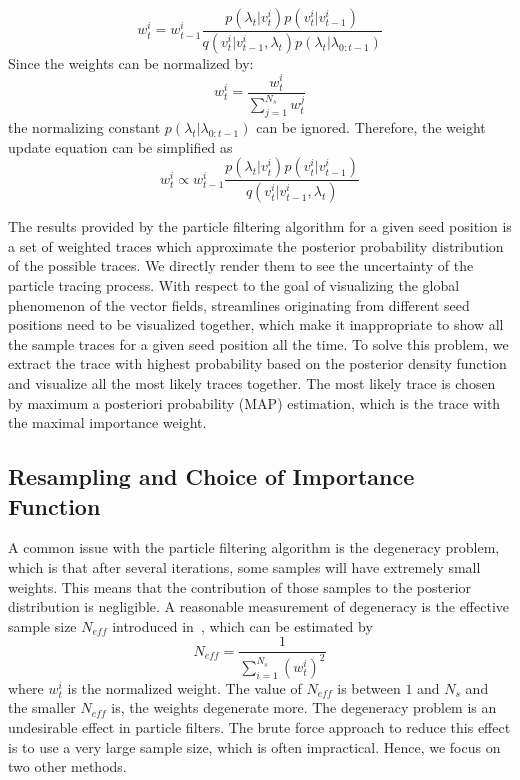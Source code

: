 \begin{equation}
  w_t^i = w_{t - 1}^i\frac{{p({\lambda_t}|v_t^i)p(v_t^i|v_{t - 1}^i)}}{{q(v_t^i|v_{t - 1}^i,{\lambda_t})p({\lambda_t}|{\lambda_{0:t - 1}})}}
\end{equation}
Since the weights can be normalized by:
\begin{equation}
  w_t^i = \frac{{w_t^i}}{{\sum\limits_{j = 1}^{{N_s}} {w_t^j} }}
\end{equation}
the normalizing constant ${p({\lambda_t}|{\lambda_{0:t - 1}})}$ can be ignored. Therefore, the weight update equation can be simplified as
\begin{equation}
  w_t^i \propto w_{t - 1}^i\frac{{p({\lambda_t}|v_t^i)p(v_t^i|v_{t - 1}^i)}}{{q(v_t^i|v_{t - 1}^i,{\lambda_t})}}
\end{equation}

The results provided by the particle filtering algorithm for a given seed position is a set of weighted traces which approximate the posterior probability distribution of the possible traces. We directly render them to see the uncertainty of the particle tracing process. With respect to the goal of visualizing the global phenomenon of the vector fields, streamlines originating from different seed positions need to be visualized together, which make it inappropriate to show all the sample traces for a given seed position all the time. To solve this problem, we extract the trace with highest probability based on the posterior density function and visualize all the most likely traces together. The most likely trace is chosen by maximum a posteriori probability (MAP) estimation, which is the trace with the maximal importance weight.

\subsection{Resampling and Choice of Importance Function}

A common issue with the particle filtering algorithm is the degeneracy problem, which is that after several iterations, some samples will have extremely small weights. This means that the contribution of those samples to the posterior distribution is negligible. A reasonable measurement of degeneracy is the effective sample size $N_{eff}$ introduced in~\cite{Liu98sequentialmonte}, which can be estimated by
\begin{equation}
  {N_{eff}} = \frac{1}{{\sum\limits_{i = 1}^{{N_s}} {{{(w_t^i)}^2}} }}
\end{equation}
where $w_t^i$ is the normalized weight. The value of $N_{eff}$ is between $1$ and $N_s$ and the smaller $N_{eff}$ is, the weights degenerate more. The degeneracy problem is an undesirable effect in particle filters. The brute force approach to reduce this effect is to use a very large sample size, which is often impractical. Hence, we focus on two other methods.


